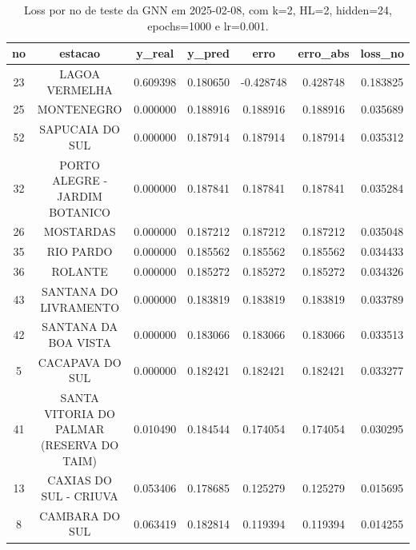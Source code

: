 \begin{table}[h]
\centering
\caption{Loss por no de teste da GNN em 2025-02-08, com k=2, HL=2, hidden=24, epochs=1000 e lr=0.001.}
\label{tab:gnn_loss_k2_hl2_h24_e1000_d20250208}
\begin{tabular}{ccccccc}
\toprule
no & estacao & y\_real & y\_pred & erro & erro\_abs & loss\_no \\
\midrule
23 & LAGOA VERMELHA & 0.609398 & 0.180650 & -0.428748 & 0.428748 & 0.183825 \\
25 & MONTENEGRO & 0.000000 & 0.188916 & 0.188916 & 0.188916 & 0.035689 \\
52 & SAPUCAIA DO SUL & 0.000000 & 0.187914 & 0.187914 & 0.187914 & 0.035312 \\
32 & PORTO ALEGRE - JARDIM BOTANICO & 0.000000 & 0.187841 & 0.187841 & 0.187841 & 0.035284 \\
26 & MOSTARDAS & 0.000000 & 0.187212 & 0.187212 & 0.187212 & 0.035048 \\
35 & RIO PARDO & 0.000000 & 0.185562 & 0.185562 & 0.185562 & 0.034433 \\
36 & ROLANTE & 0.000000 & 0.185272 & 0.185272 & 0.185272 & 0.034326 \\
43 & SANTANA DO LIVRAMENTO & 0.000000 & 0.183819 & 0.183819 & 0.183819 & 0.033789 \\
42 & SANTANA DA BOA VISTA & 0.000000 & 0.183066 & 0.183066 & 0.183066 & 0.033513 \\
5 & CACAPAVA DO SUL & 0.000000 & 0.182421 & 0.182421 & 0.182421 & 0.033277 \\
41 & SANTA VITORIA DO PALMAR (RESERVA DO TAIM) & 0.010490 & 0.184544 & 0.174054 & 0.174054 & 0.030295 \\
13 & CAXIAS DO SUL - CRIUVA & 0.053406 & 0.178685 & 0.125279 & 0.125279 & 0.015695 \\
8 & CAMBARA DO SUL & 0.063419 & 0.182814 & 0.119394 & 0.119394 & 0.014255 \\
\bottomrule
\end{tabular}
\end{table}
